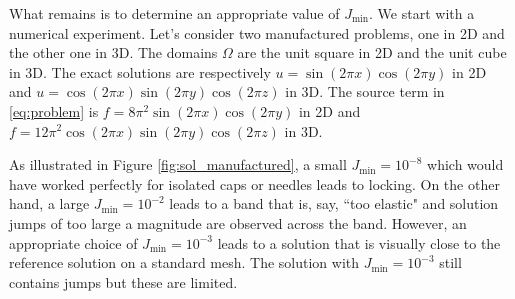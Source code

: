 \documentclass{article}
\theoremstyle{remark}
\newcommand{\Jmin}{J_{\text{min}}}
\begin{document}
What remains is to determine an appropriate value of $\Jmin$. We start with a numerical experiment. Let's consider two manufactured problems, one in 2D and the other one in 3D. 
The domains $\Omega$ are the unit square in 2D and the unit cube in 3D.
The exact solutions are respectively 
$u=\sin (2\pi x) \cos (2 \pi y)$ in 2D and $u= \cos (2\pi x) \sin (2 \pi y) \cos (2 \pi z)$ in 3D.
The source term in \eqref{eq:problem} is 
$f = 8 \pi^2 \sin (2\pi x) \cos (2 \pi y)$ in 2D and $f = 12 \pi^2 \cos (2\pi x) \sin (2 \pi y) \cos (2 \pi z)$ in 3D.

As illustrated in Figure \ref{fig:sol_manufactured}, a small $\Jmin=10^{-8}$ which would have worked perfectly for isolated caps or needles leads to locking.
On the other hand, a large $\Jmin=10^{-2}$ leads to a band that is, say, ``too elastic" and solution jumps of too large a magnitude are observed across the band.
However, an appropriate choice of $\Jmin=10^{-3}$ leads to a solution that is visually close to the reference solution on a standard mesh. The solution with $\Jmin=10^{-3}$ still contains jumps but these are limited.
\end{document}
